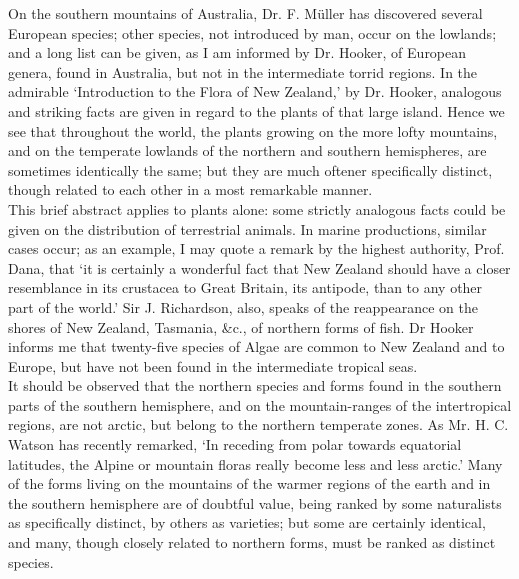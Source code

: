 \indent On the southern mountains of Australia, Dr. F. M\"{u}ller has discovered several European species; other species, not introduced by man, occur on the lowlands; and a long list can be given, as I am informed by Dr.  Hooker, of European genera, found in Australia, but not in the intermediate torrid regions. In the admirable `Introduction to the Flora of New Zealand,' by Dr. Hooker, analogous and striking facts are given in regard to the plants of that large island.  Hence we see that throughout the world, the plants growing on the more lofty mountains, and on the temperate lowlands of the northern and southern hemispheres, are sometimes identically the same; but they are much oftener specifically distinct, though related to each other in a most remarkable manner.~\\
\indent This brief abstract applies to plants alone: some strictly analogous facts could be given on the distribution of terrestrial animals. In marine productions, similar cases occur; as an example, I may quote a remark by the highest authority, Prof. Dana, that `it is certainly a wonderful fact that New Zealand should have a closer resemblance in its crustacea to Great Britain, its antipode, than to any other part of the world.' Sir J. Richardson, also, speaks of the reappearance on the shores of New Zealand, Tasmania, \&c., of northern forms of fish. Dr Hooker informs me that twenty-five species of Algae are common to New Zealand and to Europe, but have not been found in the intermediate tropical seas.~\\
\indent It should be observed that the northern species and forms found in the southern parts of the southern hemisphere, and on the mountain-ranges of the intertropical regions, are not arctic, but belong to the northern temperate zones. As Mr. H. C. Watson has recently remarked, `In receding from polar towards equatorial latitudes, the Alpine or mountain floras really become less and less arctic.' Many of the forms living on the mountains of the warmer regions of the earth and in the southern hemisphere are of doubtful value, being ranked by some naturalists as specifically distinct, by others as varieties; but some are certainly identical, and many, though closely related to northern forms, must be ranked as distinct species.~\\
